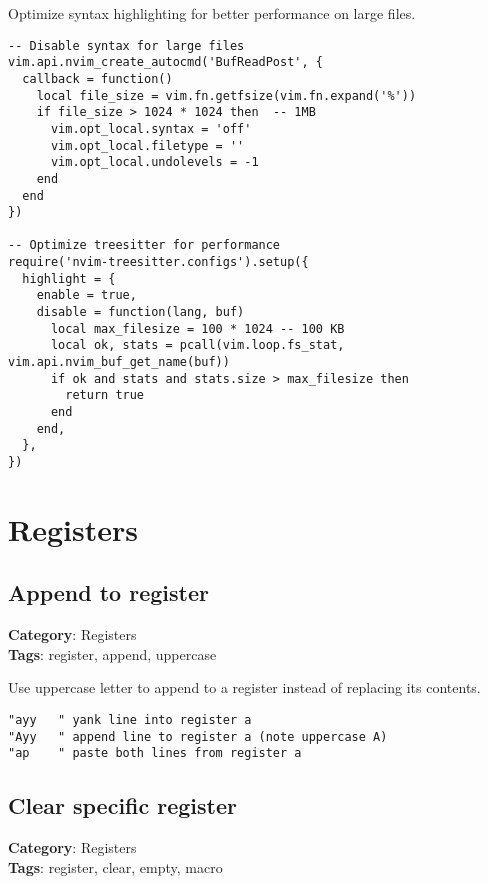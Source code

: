 {{{{{{{{{{Optimize syntax highlighting for better performance on large files.

\begin{Exa*}{}
\begin{Verbatim}[fontsize=\footnotesize, breaklines, breakanywhere]
-- Disable syntax for large files
vim.api.nvim_create_autocmd('BufReadPost', {
  callback = function()
    local file_size = vim.fn.getfsize(vim.fn.expand('%'))
    if file_size > 1024 * 1024 then  -- 1MB
      vim.opt_local.syntax = 'off'
      vim.opt_local.filetype = ''
      vim.opt_local.undolevels = -1
    end
  end
})

-- Optimize treesitter for performance
require('nvim-treesitter.configs').setup({
  highlight = {
    enable = true,
    disable = function(lang, buf)
      local max_filesize = 100 * 1024 -- 100 KB
      local ok, stats = pcall(vim.loop.fs_stat, vim.api.nvim_buf_get_name(buf))
      if ok and stats and stats.size > max_filesize then
        return true
      end
    end,
  },
})
\end{Verbatim}
\end{Exa*}

\chapter{Registers}
\section{Append to register}

\textbf{Category}: Registers\\ \textbf{Tags}: register, append, uppercase
\vspace{0.5cm}

Use uppercase letter to append to a register instead of replacing its contents.

\begin{Exa*}{}
\begin{Verbatim}[fontsize=\footnotesize, breaklines, breakanywhere]
"ayy   " yank line into register a
"Ayy   " append line to register a (note uppercase A)
"ap    " paste both lines from register a
\end{Verbatim}
\end{Exa*}

\section{Clear specific register}

\textbf{Category}: Registers\\ \textbf{Tags}: register, clear, empty, macro
\vspace{0.5cm}

}}}}}}}}}}
